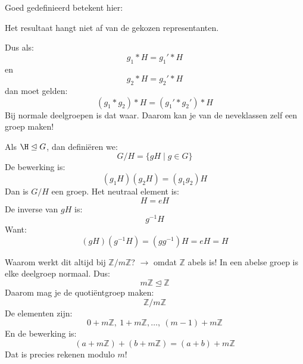 
Goed gedefinieerd betekent hier:
\begin{barbox}[PineGreen]
    Het resultaat hangt niet af van de gekozen representanten.
\end{barbox}
Dus als:
\begin{equation*}
    g_1 * H = g_1' * H
\end{equation*}
en
\begin{equation*}
    g_2 * H = g_2' * H
\end{equation*}
dan moet gelden:
\begin{equation*}
    (g_1 * g_2) * H = (g_1' * g_2') * H
\end{equation*}
Bij normale deelgroepen is dat waar. Daarom kan je van de neveklassen zelf een groep maken!


Als $\H \trianglelefteq G$, dan definiëren we:
\begin{equation*}
    G/H = \{gH \mid g \in G\}
\end{equation*}
De bewerking is:
\begin{equation*}
    (g_1H)(g_2H) = (g_1g_2)H
\end{equation*}
Dan is $G/H$ een groep. Het neutraal element is:
\begin{equation*}
    H = eH
\end{equation*}
De inverse van $gH$ is:
\begin{equation*}
    g^{-1}H
\end{equation*}
Want:
\begin{equation*}
    (gH)(g^{-1}H) = (gg^{-1})H = eH = H
\end{equation*}


Waarom werkt dit altijd bij $\mathbb{Z}/m\mathbb{Z}$? $\to$ omdat $\mathbb{Z}$ abels is! In een abelse groep is elke deelgroep normaal. Dus:
\begin{equation*}
    m\mathbb{Z} \trianglelefteq \mathbb{Z}
\end{equation*}
Daarom mag je de quotiëntgroep maken:
\begin{equation*}
    \mathbb{Z}/m\mathbb{Z}
\end{equation*}
De elementen zijn:
\begin{equation*}
    0 + m\mathbb{Z},\ 1 + m\mathbb{Z},\dots,\ (m-1) + m\mathbb{Z}
\end{equation*}
En de bewerking is:
\begin{equation*}
    (a + m\mathbb{Z}) + (b + m\mathbb{Z}) = (a + b) + m\mathbb{Z}
\end{equation*}
Dat is precies rekenen modulo $m$!

